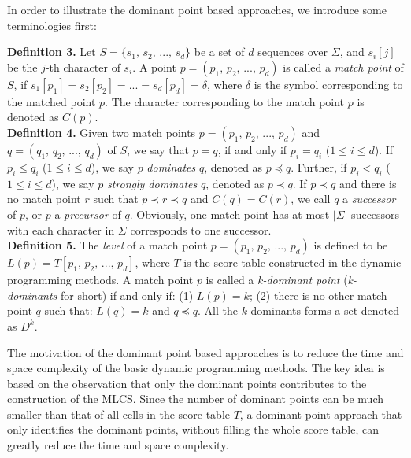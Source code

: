 \documentclass{article}
\begin{document}
In order to illustrate the dominant point based approaches, we
introduce some terminologies first:

\textbf{Definition 3.} Let $S = \{s_1,\, s_2,\, ...,\, s_d\}$ be a set
of $d$ sequences over $\Sigma$, and $s_i[j]$ be the $j$-th character
of $s_i$. A point $p = (p_1,\, p_2,\, ...,\, p_d)$ is called a
\emph{match point} of $S$, if $s_1[p_1] = s_2[p_2] = ... = s_d[p_d] =
\delta$, where $\delta$ is the symbol corresponding to the matched
point $p$. The character corresponding to the match point $p$ is
denoted as $C(p)$.\\

\textbf{Definition 4.} Given two match points $p = (p_1,\, p_2,\,
...,\, p_d)$ and $q = (q_1,\, q_2,\, ...,\, q_d)$ of $S$, we say that
$p = q$, if and only if $p_i = q_i$ ($1 \leq i \leq d$). If $p_i \leq
q_i$ ($1 \leq i \leq d$), we say $p$ \emph{dominates} $q$, denoted as
$p \preceq q$. Further, if $p_i < q_i$ ($1 \leq i \leq d$), we say $p$
\emph{strongly dominates} $q$, denoted as $p \prec q$.  If $p \prec q$
and there is no match point $r$ such that $p \prec r \prec q$ and
$C(q) = C(r)$, we call $q$ a \emph{successor} of $p$, or $p$ a
\emph{precursor} of $q$. Obviously, one match point has at most
$|\Sigma|$ successors with each character in $\Sigma$ corresponds to
one successor. \\

\textbf{Definition 5.} The \emph{level} of a match point $p = (p_1,\,
p_2,\, ...,\, p_d)$ is defined to be $L(p) = T[p_1,\, p_2,\, ...,\,
p_d]$, where $T$ is the score table constructed in the dynamic
programming methods. A match point $p$ is called a \emph{k-dominant
point} (\emph{k-dominants} for short) if and only if: (1) $L(p) = k$;
(2) there is no other match point $q$ such that: $L(q) = k$ and $q
\preceq q$. All the $k$-dominants forms a set denoted as $D^k$.

The motivation of the dominant point based approaches is to reduce the
time and space complexity of the basic dynamic programming
methods. The key idea is based on the observation that only the
dominant points contributes to the construction of the MLCS. Since the
number of dominant points can be much smaller than that of all cells
in the score table $T$, a dominant point approach that only identifies
the dominant points, without filling the whole score table, can
greatly reduce the time and space complexity.
\end{document}
